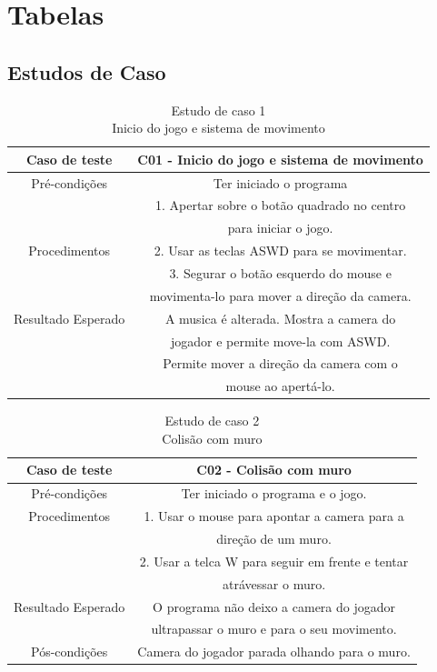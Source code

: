 \section{Tabelas}\label{tabelas}

\subsection{Estudos de Caso}\label{cases}

\begin{table}[h]
\begin{center}
\begin{tabular}{|c|c|}
\hline 
Caso de teste & C01 - Inicio do jogo e sistema de movimento\tabularnewline
\hline 
Pré-condições & Ter iniciado o programa\tabularnewline
\hline 
 & 1. Apertar sobre o botão quadrado no centro\\ & para iniciar o jogo.\tabularnewline
Procedimentos 
& 2. Usar as teclas ASWD para se movimentar.\tabularnewline
& 3. Segurar o botão esquerdo do mouse e \\ &movimenta-lo para mover a direção
da camera.\tabularnewline
\hline 
Resultado Esperado 
& A musica é alterada. Mostra a camera do\\ 
& jogador e permite move-la com ASWD. \\ 
& Permite mover a direção da camera com o \\ 
& mouse ao apertá-lo. \tabularnewline
\hline 
\end{tabular}
\caption{Estudo de caso 1 \\ Inicio do jogo e sistema de movimento}
\label{C01}
\end{center}
\end{table}


\begin{table}[h]
\begin{center}
\begin{tabular}{|c|c|}
\hline 
Caso de teste & C02 - Colisão com muro\tabularnewline
\hline 
Pré-condições & Ter iniciado o programa e o jogo.\tabularnewline
\hline 
Procedimentos & 1. Usar o mouse para apontar a camera para a \\ & direção de um muro.\tabularnewline
 & 2. Usar a telca W para seguir em frente e tentar \\ & atrávessar o muro.\tabularnewline
\hline 
Resultado Esperado & O programa não deixo a camera do jogador \\ & ultrapassar o muro e para
o seu movimento.\tabularnewline
\hline 
Pós-condições & Camera do jogador parada olhando para o muro.\tabularnewline
\hline 
\end{tabular}
\caption{Estudo de caso 2 \\ Colisão com muro}
\label{C02}
\end{center}
\end{table}


